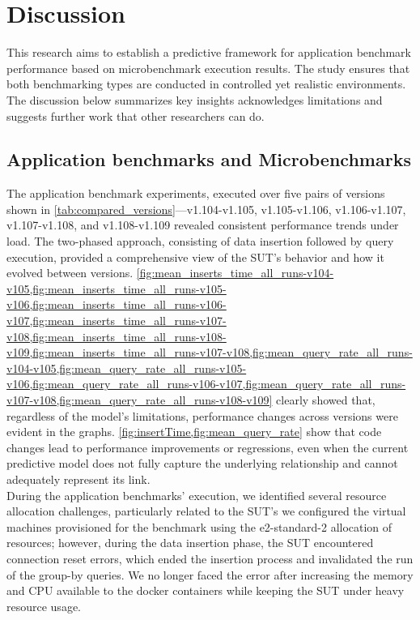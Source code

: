 \section{Discussion}
\label{cha:discussion}
This research aims to establish a predictive framework for application benchmark performance based on microbenchmark execution results. The study ensures that both benchmarking types are conducted in controlled yet realistic environments. The discussion below summarizes key insights acknowledges limitations and suggests further work that other researchers can do. 

\subsection{Application benchmarks and Microbenchmarks}
The application benchmark experiments, executed over five pairs of versions shown in  \cref{tab:compared_versions}—v1.104-v1.105, v1.105-v1.106, v1.106-v1.107, v1.107-v1.108, and v1.108-v1.109 revealed consistent performance trends under load. The two-phased approach, consisting of data insertion followed by query execution, provided a comprehensive view of the \ac{SUT}'s behavior and how it evolved between versions. \cref{fig:mean_inserts_time_all_runs-v104-v105,fig:mean_inserts_time_all_runs-v105-v106,fig:mean_inserts_time_all_runs-v106-v107,fig:mean_inserts_time_all_runs-v107-v108,fig:mean_inserts_time_all_runs-v108-v109,fig:mean_inserts_time_all_runs-v107-v108,fig:mean_query_rate_all_runs-v104-v105,fig:mean_query_rate_all_runs-v105-v106,fig:mean_query_rate_all_runs-v106-v107,fig:mean_query_rate_all_runs-v107-v108,fig:mean_query_rate_all_runs-v108-v109} clearly showed that, regardless of the model's limitations, performance changes across versions were evident in the graphs. \cref{fig:insertTime,fig:mean_query_rate} show that code changes lead to performance improvements or regressions, even when the current predictive model does not fully capture the underlying relationship and cannot adequately represent its link. \\
During the application benchmarks' execution, we identified several resource allocation challenges, particularly related to the \ac{SUT}'s we configured the virtual machines provisioned for the benchmark using the e2-standard-2 allocation of resources; however, during the data insertion phase, the \ac{SUT} encountered connection reset errors, which ended the insertion process and invalidated the run of the group-by queries. We no longer faced the error after increasing the memory and \ac{CPU} available to the docker containers while keeping the \ac{SUT} under heavy resource usage.\\
